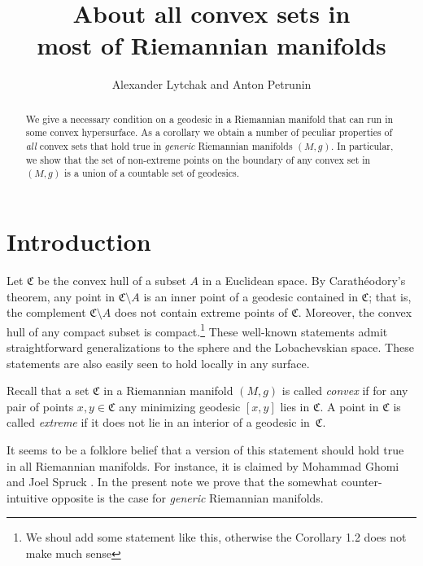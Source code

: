 \documentclass[a4paper,10pt]{article}
\begin{document}
 
\title{About all convex sets in\\
most of Riemannian manifolds}
\author{Alexander Lytchak and Anton Petrunin}
\date{}
\maketitle

\begin{abstract}
We give a necessary condition on a geodesic in a Riemannian manifold that can run in some convex hypersurface.
As a corollary we obtain a number of peculiar properties of \emph{all} convex sets that hold true in \emph{generic} Riemannian manifolds $(M,g)$.
In particular, we show that the set of non-extreme points on the boundary of any convex set in $(M,g)$
is a union of a countable set of geodesics.
\end{abstract}

\section{Introduction}
Let $\mathfrak{C}$ be the convex hull of a subset $A$ in a Euclidean space.
By Carathéodory's theorem, any point in $\mathfrak{C}\setminus A$ is an inner point of a geodesic contained in $\mathfrak{C}$;
that is, the complement $\mathfrak{C} \setminus A$ does not contain extreme points of $\mathfrak{C}$. 
{\color{red} Moreover, the convex hull of any compact subset
	is  compact.\footnote{We shoul add some statement like this, otherwise the Corollary 1.2 does not make much sense}}  
These well-known statements admit straightforward generalizations to the sphere and the Lobachevskian space. 
{\color{red} These statements are also easily seen to hold locally in any surface.} 


Recall that a set $\mathfrak{C}$ in a Riemannian manifold $(M,g)$ is called \emph{convex} if for any pair of points $x,y\in \mathfrak{C}$ any minimizing geodesic $[x,y]$ lies in $\mathfrak{C}$.
A point in $\mathfrak{C}$ is called \emph{extreme} if it does not lie in an interior of a geodesic in~$\mathfrak{C}$.

It seems to be a folklore belief that a version of this statement should hold true in all Riemannian manifolds. 
For instance, it is claimed by Mohammad Ghomi and Joel Spruck \cite[Lemma 9.1]{Ghomi}.
In the present note we prove that the somewhat counter-intuitive opposite is the case for \emph{generic} Riemannian manifolds. 
\end{document}
